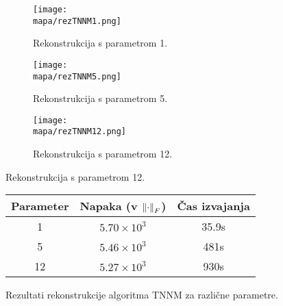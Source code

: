 \renewcommand{\mapa}{Poglavja/Slike/informacija ranga}
\begin{figure}[!ht]
    \begin{subfigure}{0.325\linewidth}
        \texttt{[image: \\mapa/rezTNNM1.png]}
        \caption{Rekonstrukcija s parametrom 1.}
    \end{subfigure}
    \hfill
    \begin{subfigure}{0.325\linewidth}
        \texttt{[image: \\mapa/rezTNNM5.png]}
        \caption{Rekonstrukcija s parametrom 5.}
    \end{subfigure}
    \hfill
    \begin{subfigure}{0.325\linewidth}
        \texttt{[image: \\mapa/rezTNNM12.png]}
        \caption{Rekonstrukcija s parametrom 12.}
    \end{subfigure}
\end{figure}

\begin{figure}[h]
    \centering
    \begin{tabular}{|c|c|c|}
        \hline
        Parameter & Napaka (v $\left\lVert\cdot\right\rVert_F$) & Čas izvajanja \\
        \hline
        1 & $5.70 \times 10^{3}$ & 35.9s \\
        5 & $5.46 \times 10^{3}$ & 481s \\
        12 & $5.27 \times 10^{3}$ & 930s \\
        \hline
    \end{tabular}
    \caption{Rezultati rekonstrukcije algoritma TNNM za različne parametre.}
\end{figure}
